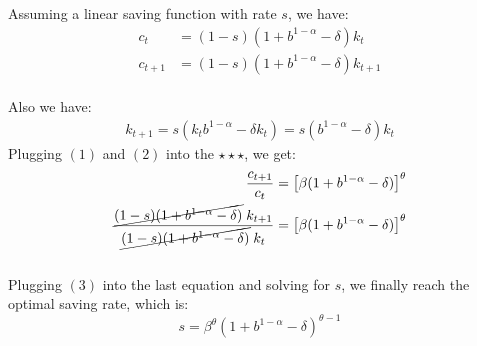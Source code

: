 \documentclass[12pt]{extarticle}
\newcommand{\threes}{$\star\star\star$}
\begin{document}
Assuming a linear saving function with rate $s$, we have:
\begin{align*}
    c_t &= (1-s)(1 + b^{1-\alpha} - \delta)k_t \tag{$1$}\\
    c_{t+1} &= (1-s)(1 + b^{1-\alpha} - \delta)k_{t+1} \tag{$2$}
\end{align*}\\
Also we have:
\begin{align*}
    k_{t+1}=s(k_tb^{1-\alpha}-\delta k_t)=s(b^{1-\alpha}-\delta)k_t \tag{$3$}
\end{align*}
Plugging $(1)$ and $(2)$ into the \threes, we get:
\begin{align*}
    \frac{c_{t+1}}{c_t} &= \bigl[\beta(1 + b^{1-\alpha} - \delta)\bigr]^{\theta} \\
    \frac{\cancel{(1-s)(1 + b^{1-\alpha} - \delta)}\;k_{t+1}}{\cancel{(1-s)(1 + b^{1-\alpha} - \delta)}\;k_t} &= \bigl[\beta(1 + b^{1-\alpha} - \delta)\bigr]^{\theta} \\
\end{align*}\\
Plugging $(3)$ into the last equation and solving for $s$, we finally reach the optimal saving rate, which is:
$$s = \beta^{\theta} (1 + b^{1-\alpha} - \delta)^{\theta-1}$$
\end{document}
